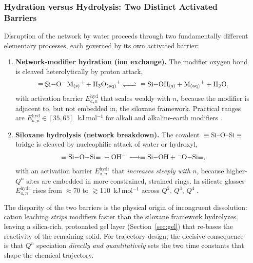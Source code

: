 \documentclass[11pt]{article}
\begin{document}
\subsubsection{Hydration versus Hydrolysis: Two Distinct Activated Barriers}


Disruption of the network by water proceeds through two fundamentally different elementary processes, each governed by its own activated barrier:


\begin{enumerate}[leftmargin=1.6em]
\item \textbf{Network-modifier hydration (ion exchange).} The modifier oxygen bond is cleaved heterolytically by proton attack,
\begin{equation}
\ce{\equiv Si-O- M+_{(s)} + H3O+_{(aq)} <=> \equiv Si-OH_{(s)} + M+_{(aq)} + H2O},
\label{eq:ion_exchange}
\end{equation}
with activation barrier $E_{a,n}^{\mathrm{hyd}}$ that scales weakly with $n$, because the modifier is adjacent to, but not embedded in, the siloxane framework. Practical ranges are $E_{a,n}^{\mathrm{hyd}}\in[35,65]$~kJ\,mol$^{-1}$ for alkali and alkaline-earth modifiers \cite{Magi1984,Neuville2008}.


\item \textbf{Siloxane hydrolysis (network breakdown).} The covalent $\equiv$Si--O--Si$\equiv$ bridge is cleaved by nucleophilic attack of water or hydroxyl,
\begin{equation}
\ce{\equiv Si-O-Si\equiv{} + OH- \longrightarrow \equiv Si-OH + {}^{-}O-Si\equiv},
\label{eq:hydrolysis}
\end{equation}
with an activation barrier $E_{a,n}^{\mathrm{hydr}}$ that \emph{increases steeply with $n$}, because higher-$Q^n$ sites are embedded in more constrained, strained rings. In silicate glasses $E_{a,n}^{\mathrm{hydr}}$ rises from $\approx$70 to $\gtrsim$110~kJ\,mol$^{-1}$ across $Q^2$, $Q^3$, $Q^4$ \cite{Hench1996,Hill2010,Fodor2005}.
\end{enumerate}


The disparity of the two barriers is the physical origin of incongruent dissolution: cation leaching \emph{strips} modifiers faster than the siloxane framework hydrolyzes, leaving a silica-rich, protonated gel layer (Section~\ref{sec:gel}) that re-bases the reactivity of the remaining solid. For trajectory design, the decisive consequence is that $Q^n$ speciation \emph{directly and quantitatively} sets the two time constants that shape the chemical trajectory.
\end{document}
